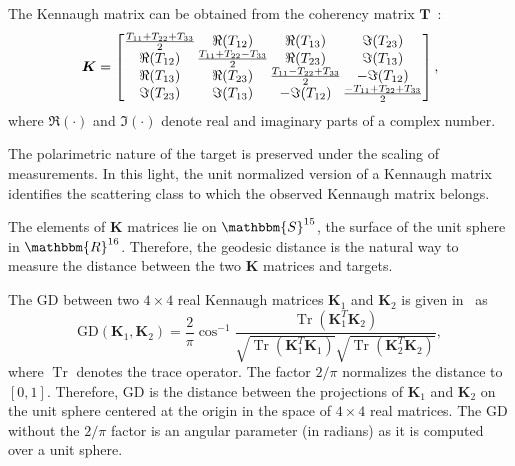 \documentclass[journal]{IEEEtran}
\DeclareMathOperator{\Tr}{Tr}
\begin{document}
The Kennaugh matrix can be obtained from the coherency matrix $\bm{T}$~\cite{PolarisationApplicationsRemoteSensing}:
\begin{equation}
	\label{incoKen}
	\bm{K} =
\arraycolsep=.6pt
	\begin{bmatrix}
		\frac{T_{11}+T_{22}+ T_{33}}{2} & \Re(T_{12}) & \Re(T_{13}) & \Im(T_{23})\\
		\Re(T_{12}) & \frac{T_{11}+T_{22}-T_{33}}{2} & \Re(T_{23}) & \Im(T_{13})\\
		\Re(T_{13}) & \Re(T_{23}) & \frac{T_{11}-T_{22}+T_{33}}{2} & - \Im(T_{12})\\
		\Im(T_{23}) & \Im(T_{13}) & - \Im(T_{12}) &\frac{-T_{11}+T_{22}+T_{33}}{2}
	\end{bmatrix},
\end{equation}
where $\Re(\cdot)$ and $\Im(\cdot)$ denote real and imaginary parts of a complex number. 

The polarimetric nature of the target is preserved under the scaling of measurements. 
In this light, the unit normalized version of a Kennaugh matrix identifies the scattering class to which the observed Kennaugh matrix belongs.

The elements of $\bm{K}$ matrices lie on $\mathbbm{S}^{15}$, the surface of the unit sphere in $\mathbbm{R}^{16}$. 
Therefore, the geodesic distance is the natural way to measure the distance between the two $\bm{K}$ matrices and targets. 

The $\text{GD}$ between two $4 \times 4$ real Kennaugh matrices $\bm{K}_1$ and $\bm{K}_2$ is given in~\cite{APolSARScatteringPowerFactorizationFrameworkandNovelRollInvariantParametersBasedUnsupervisedClassificationSchemeUsingaGeodesicDistanceinpress} as
\begin{equation}
	\text{GD}(\bm{K}_1,\bm{K}_2) =  \frac{2}{\pi} \cos^{-1}\frac{\Tr(\bm{K}_1^T\bm{K}_2)}{\sqrt{\Tr(\bm{K}_1^T\bm{K}_1)}\sqrt{\Tr(\bm{K}_2^T\bm{K}_2)}} ,
	\label{eq:GD_Ken}
\end{equation}
where $\Tr$ denotes the trace operator. 
The factor $2/\pi$ normalizes the distance to $[0,1]$. 
Therefore, $\text{GD}$ is the distance between the projections of $\bm{K}_1$ and $\bm{K}_2$ on the unit sphere centered at the origin in the space of $4 \times 4$ real matrices. 
The $\text{GD}$ without the $2/\pi$ factor is an angular parameter (in radians) as it is computed over a unit sphere. 
\end{document}
